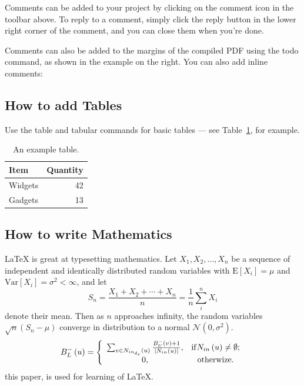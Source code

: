 \documentclass[a4paper]{article}
\begin{document}
Comments can be added to your project by clicking on the comment icon in the toolbar above. %
%
%
To reply to a comment, simply click the reply button in the lower right corner of the comment, and you can close them when you're done.

Comments  can also be added to the margins of the compiled PDF using the todo command, as shown in the example on the right. You can also add inline comments:


\subsection{How to add Tables}

Use the table and tabular commands for basic tables --- see Table~\ref{tab:widgets}, for example. 

\begin{table}
\centering
\begin{tabular}{l|r}
Item & Quantity \\\hline
Widgets & 42 \\
Gadgets & 13
\end{tabular}
\caption{\label{tab:widgets}An example table.}
\end{table}

\subsection{How to write Mathematics}

\LaTeX{} is great at typesetting\(\) mathematics. Let $X_1, X_2, \ldots, X_n$ be a sequence of independent and identically distributed random variables with $\text{E}[X_i] = \mu$ and $\text{Var}[X_i] = \sigma^2 < \infty$, and let
\[S_n = \frac{X_1 + X_2 + \cdots + X_n}{n}
      = \frac{1}{n}\sum_{i}^{n} X_i\]
denote their mean. Then as $n$ approaches infinity, the random variables $\sqrt{n}(S_n - \mu)$ converge in distribution to a normal $\mathcal{N}(0, \sigma^2)$.
\[B_L^ - \left( u \right) = \left\{ {\begin{array}{*{20}{c}}
{\sum\nolimits_{v \in {N_{in_{d_s}}}\left( u \right)} {\frac{{B_U^ - \left( v \right) + 1}}{{\left| {{N_{in}}\left( u \right)} \right|}},} }&{{\rm{if }}{N_{in}}\left( u \right) \ne \emptyset ;}\\
{0,}&{{\rm{otherwize}}{\rm{.}}}
\end{array}} \right.\]
this paper, is used for learning of \LaTeX.
\end{document}
